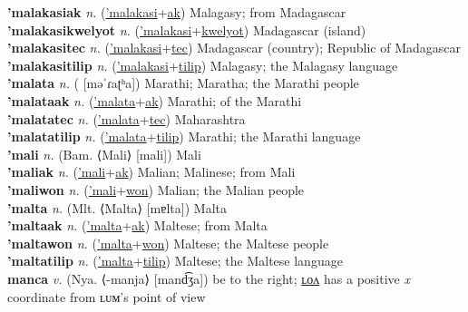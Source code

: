 \textbf{'malakasiak} \textit{n.} (\hyperref['malakasi]{'malakasi}+\hyperref[ak]{ak})
Malagasy; from Madagascar \label{'malakasiak} \\
\textbf{'malakasikwelyot} \textit{n.} (\hyperref['malakasi]{'malakasi}+\hyperref[kwelyot]{kwelyot})
Madagascar (island) \label{'malakasikwelyot} \\
\textbf{'malakasitec} \textit{n.} (\hyperref['malakasi]{'malakasi}+\hyperref[tec]{tec})
Madagascar (country); Republic of Madagascar \label{'malakasitec} \\
\textbf{'malakasitilip} \textit{n.} (\hyperref['malakasi]{'malakasi}+\hyperref[tilip]{tilip})
Malagasy; the Malagasy language \label{'malakasitilip} \\
\textbf{'malata} \textit{n.} ( [məˈɾaʈʰa])
Marathi; Maratha; the Marathi people \label{'malata} \\
\textbf{'malataak} \textit{n.} (\hyperref['malata]{'malata}+\hyperref[ak]{ak})
Marathi; of the Marathi \label{'malataak} \\
\textbf{'malatatec} \textit{n.} (\hyperref['malata]{'malata}+\hyperref[tec]{tec})
Maharashtra \label{'malatatec} \\
\textbf{'malatatilip} \textit{n.} (\hyperref['malata]{'malata}+\hyperref[tilip]{tilip})
Marathi; the Marathi language \label{'malatatilip} \\
\textbf{'mali} \textit{n.} (Bam. ⟨Mali⟩ [mali])
Mali \label{'mali} \\
\textbf{'maliak} \textit{n.} (\hyperref['mali]{'mali}+\hyperref[ak]{ak})
Malian; Malinese; from Mali \label{'maliak} \\
\textbf{'maliwon} \textit{n.} (\hyperref['mali]{'mali}+\hyperref[won]{won})
Malian; the Malian people \label{'maliwon} \\
\textbf{'malta} \textit{n.} (Mlt. ⟨Malta⟩ [mɐlta])
Malta \label{'malta} \\
\textbf{'maltaak} \textit{n.} (\hyperref['malta]{'malta}+\hyperref[ak]{ak})
Maltese; from Malta \label{'maltaak} \\
\textbf{'maltawon} \textit{n.} (\hyperref['malta]{'malta}+\hyperref[won]{won})
Maltese; the Maltese people \label{'maltawon} \\
\textbf{'maltatilip} \textit{n.} (\hyperref['malta]{'malta}+\hyperref[tilip]{tilip})
Maltese; the Maltese language \label{'maltatilip} \\
\textbf{manca} \textit{v.} (Nya. ⟨-manja⟩ [mand͡ʒa])
be to the right; \hyperref[mancalon]{ʟᴏᴧ} has a positive \textit{x} coordinate from ʟᴜᴍ’s point of view \label{manca} \\
